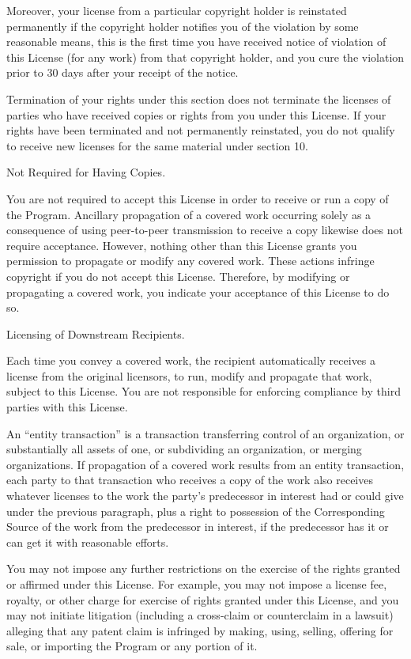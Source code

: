 Moreover, your license from a particular copyright holder is
reinstated permanently if the copyright holder notifies you of the
violation by some reasonable means, this is the first time you have
received notice of violation of this License (for any work) from that
copyright holder, and you cure the violation prior to 30 days after
your receipt of the notice.

Termination of your rights under this section does not terminate the
licenses of parties who have received copies or rights from you under
this License.  If your rights have been terminated and not permanently
reinstated, you do not qualify to receive new licenses for the same
material under section 10.

\itemAcceptance Not Required for Having Copies.

You are not required to accept this License in order to receive or run
a copy of the Program.  Ancillary propagation of a covered work
occurring solely as a consequence of using peer-to-peer transmission
to receive a copy likewise does not require acceptance.  However,
nothing other than this License grants you permission to propagate or
modify any covered work.  These actions infringe copyright if you do
not accept this License.  Therefore, by modifying or propagating a
covered work, you indicate your acceptance of this License to do so.

\itemAutomatic Licensing of Downstream Recipients.

Each time you convey a covered work, the recipient automatically
receives a license from the original licensors, to run, modify and
propagate that work, subject to this License.  You are not responsible
for enforcing compliance by third parties with this License.

An ``entity transaction'' is a transaction transferring control of an
organization, or substantially all assets of one, or subdividing an
organization, or merging organizations.  If propagation of a covered
work results from an entity transaction, each party to that
transaction who receives a copy of the work also receives whatever
licenses to the work the party's predecessor in interest had or could
give under the previous paragraph, plus a right to possession of the
Corresponding Source of the work from the predecessor in interest, if
the predecessor has it or can get it with reasonable efforts.

You may not impose any further restrictions on the exercise of the
rights granted or affirmed under this License.  For example, you may
not impose a license fee, royalty, or other charge for exercise of
rights granted under this License, and you may not initiate litigation
(including a cross-claim or counterclaim in a lawsuit) alleging that
any patent claim is infringed by making, using, selling, offering for
sale, or importing the Program or any portion of it.

